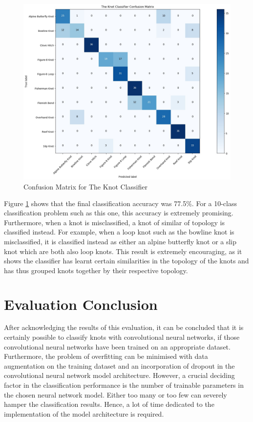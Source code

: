 \documentclass{l4proj}
\begin{document}
\begin{figure}
	\centering
	\includegraphics[scale=0.4]{confusionMatrix}
	\caption{Confusion Matrix for The Knot Classifier}
	\label{fig:ConfusionMatrix}
\end{figure}

Figure \ref{fig:ConfusionMatrix} shows that the final classification accuracy was 77.5\%.
For a 10-class classification problem such as this one, this accuracy is extremely promising.
Furthermore, when a knot is misclassified, a knot of similar of topology is classified instead.
For example, when a loop knot such as the bowline knot is misclassified, it is classified instead as either an alpine butterfly knot or a slip knot which are both also loop knots.
This result is extremely encouraging, as it shows the classifier has learnt certain similarities in the topology of the knots and has thus grouped knots together by their respective topology.

\section{Evaluation Conclusion}
After acknowledging the results of this evaluation, it can be concluded that it is certainly possible to classify knots with convolutional neural networks, if those convolutional neural networks have been trained on an appropriate dataset.
Furthermore, the problem of overfitting can be minimised with data augmentation on the training dataset and an incorporation of dropout in the convolutional neural network model architecture.
However, a crucial deciding factor in the classification performance is the number of trainable parameters in the chosen neural network model. Either too many or too few can severely hamper the classification results. Hence, a lot of time dedicated to the implementation of the model architecture is required.
\end{document}
